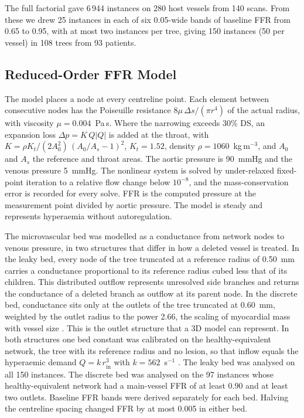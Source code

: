 The full factorial gave 6\,944 instances on 280 host vessels from 140 scans. From these we drew 25 instances in each
of six 0.05-wide bands of baseline FFR from 0.65 to 0.95, with at most two instances per tree, giving 150 instances
(50 per vessel) in 108 trees from 93 patients.

\subsection{Reduced-Order FFR Model}
The model places a node at every centreline point. Each element between consecutive nodes has the Poiseuille
resistance $8\mu\,\Delta s/(\pi r^4)$ of the actual radius, with viscosity $\mu = 0.004$~Pa\,s. Where the narrowing
exceeds 30\% DS, an expansion loss $\Delta p = K\,Q|Q|$ is added at the throat, with
$K = \rho K_t/(2A_0^2)\,(A_0/A_s-1)^2$, $K_t = 1.52$, density $\rho = 1060$~kg\,m$^{-3}$, and $A_0$ and $A_s$ the
reference and throat areas. The aortic pressure is 90~mmHg and the venous pressure 5~mmHg. The nonlinear system is
solved by under-relaxed fixed-point iteration to a relative flow change below $10^{-8}$, and the mass-conservation
error is recorded for every solve. FFR is the computed pressure at the measurement point divided by aortic pressure.
The model is steady and represents hyperaemia without autoregulation.

The microvascular bed was modelled as a conductance from network nodes to venous pressure, in two structures that
differ in how a deleted vessel is treated. In the leaky bed, every node of the tree truncated at a reference radius
of 0.50~mm carries a conductance proportional to its reference radius cubed less that of its children. This
distributed outflow represents unresolved side branches \cite{gosling2020} and returns the conductance of a deleted
branch as outflow at its parent node. In the discrete bed, conductance sits only at the outlets of the tree truncated
at 0.60~mm, weighted by the outlet radius to the power 2.66, the scaling of myocardial mass with vessel size
\cite{choy2008}. This is the outlet structure that a 3D model can represent. In both structures one bed constant was
calibrated on the healthy-equivalent network, the tree with its reference radius and no lesion, so that inflow equals
the hyperaemic demand $Q = k\,r_\mathrm{in}^3$ with $k = 562$~s$^{-1}$ \cite{murray1926}. The leaky bed was analysed
on all 150 instances. The discrete bed was analysed on the 97 instances whose healthy-equivalent network had a
main-vessel FFR of at least 0.90 and at least two outlets. Baseline FFR bands were derived separately for each bed.
Halving the centreline spacing changed FFR by at most 0.005 in either bed.

